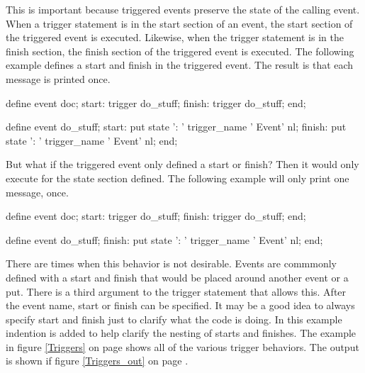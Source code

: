 This is important because triggered events preserve the state of
the calling event.  When a trigger statement is in the start section
of an event, the start section of the triggered event is executed. 
Likewise, when the trigger statement is in the finish section, the
finish section of the triggered event is executed.  The following
example defines a start and finish in the triggered event. 
The result is that each message is printed once.

\begin{sfvcode}
   define event doc; 
      start:
          trigger do_stuff;
      finish:
          trigger do_stuff;
   end;

   define event do_stuff;
       start:
           put state ': ' trigger_name ' Event' nl;
       finish:
           put state ': ' trigger_name ' Event' nl;
   end;
\end{sfvcode}

But what if the triggered event only defined a start or finish?  
Then it would only execute for the state section defined.  The following
example will only print one message, once.

\begin{sfvcode}
   define event doc; 
      start:
          trigger do_stuff;
      finish:
          trigger do_stuff;
   end;

   define event do_stuff;
       finish:
           put state ': ' trigger_name ' Event' nl;
   end;
\end{sfvcode}

There are times when this behavior is not desirable.  Events are commmonly
defined with a start and finish that would be placed around another event
or a put.  There is a third argument to the trigger statement that allows
this.  After the event name, start or finish can be specified.  It may be a
good idea to always specify start and finish just to clarify what the code
is doing.  In this example indention is added to help clarify the nesting
of starts and finishes.  
The example in figure \ref{Triggers} on page \pageref{Triggers}
shows all of the various trigger behaviors.  
The output is shown if figure \ref{Triggers_out} on page \pageref{Triggers_out}.

